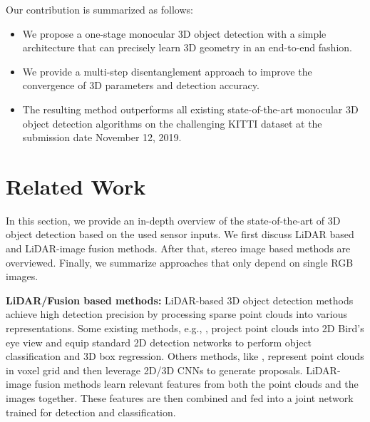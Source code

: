 \documentclass[10pt,twocolumn,letterpaper]{article}
\renewcommand{\paragraph}[1]{

        \vspace{3pt}
	\noindent\textbf{#1}}
\begin{document}
    Our contribution is summarized as follows:
    \begin{itemize}
        \item We propose a one-stage monocular 3D object detection with a simple architecture that can precisely learn 3D geometry in an end-to-end fashion.
        \item We provide a multi-step disentanglement approach to improve the convergence of 3D parameters and detection accuracy.
        \item The resulting method outperforms all existing state-of-the-art monocular 3D object detection algorithms on the challenging KITTI dataset at the submission date November 12, 2019.
    \end{itemize}
    

\section{Related Work} \label{sec:1}

In this section, we provide an in-depth overview of the state-of-the-art of 3D object detection based on the used sensor inputs. We first discuss LiDAR based and LiDAR-image fusion methods. After that, stereo image based methods are overviewed. Finally, we summarize approaches that only depend on single RGB images.
    
    \paragraph{LiDAR/Fusion based methods:} 
    LiDAR-based 3D object detection methods achieve high detection precision by processing sparse point clouds into various representations. Some existing methods, e.g., \cite{velofcn_2016, PIXOR_2018}, project point clouds into 2D Bird's eye view and equip standard 2D detection networks to perform object classification and 3D box regression. Others methods, like \cite{voxelnet_2018, pp_2019, 3dfcn_2017, second_2018}, represent point clouds in voxel grid and then leverage 2D/3D CNNs to generate proposals. LiDAR-image fusion methods \cite{mmf_2019, frustum_2019, MV3D_2017} learn relevant features from both the point clouds and the images together. These features are then combined and fed into a joint network trained for detection and classification.  
\end{document}
